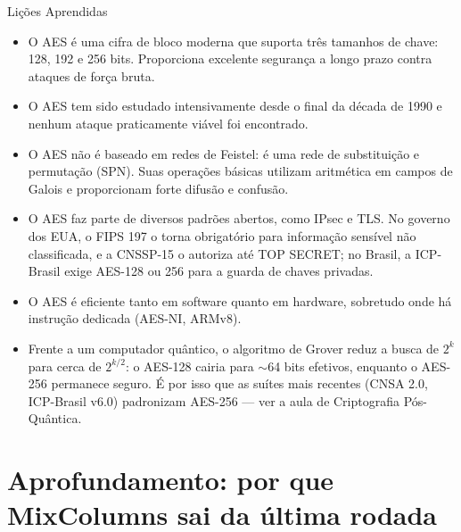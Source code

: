 \documentclass{beamer}
\begin{document}

\begin{frame}{Lições Aprendidas}

\begin{itemize}
    \footnotesize
    \item O AES é uma cifra de bloco moderna que suporta três tamanhos de chave: 128, 192 e 256 bits. Proporciona excelente segurança a longo prazo contra ataques de força bruta.
    
    \item O AES tem sido estudado intensivamente desde o final da década de 1990 e nenhum ataque praticamente viável foi encontrado.
    
    \item O AES não é baseado em redes de Feistel: é uma rede de substituição e permutação (SPN). Suas operações básicas utilizam aritmética em campos de Galois e proporcionam forte difusão e confusão.
    
    \item O AES faz parte de diversos padrões abertos, como IPsec e TLS. No governo dos EUA, o FIPS 197 o torna obrigatório para informação sensível não classificada, e a CNSSP-15 o autoriza até TOP SECRET; no Brasil, a ICP-Brasil exige AES-128 ou 256 para a guarda de chaves privadas.
    
    \item O AES é eficiente tanto em software quanto em hardware, sobretudo onde há instrução dedicada (AES-NI, ARMv8).

    \item Frente a um computador quântico, o algoritmo de Grover reduz a busca de $2^k$ para cerca de $2^{k/2}$: o AES-128 cairia para $\sim$64 bits efetivos, enquanto o AES-256 permanece seguro. É por isso que as suítes mais recentes (CNSA 2.0, ICP-Brasil v6.0) padronizam AES-256 --- ver a aula de Criptografia Pós-Quântica.
\end{itemize}

\end{frame}

\section{Aprofundamento: por que MixColumns sai da última rodada}
\end{document}
